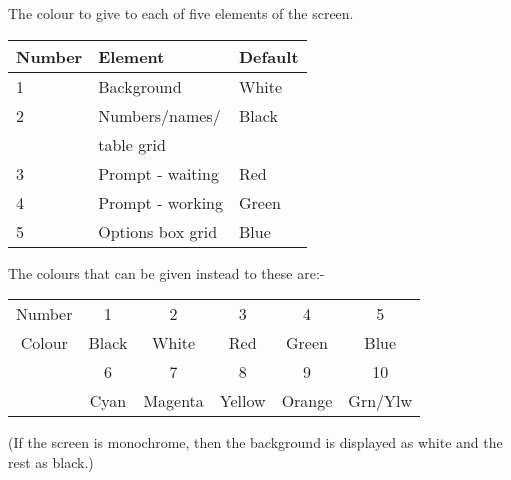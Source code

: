 \begin{small}
{{{  The colour to give to each of five elements of the screen.

\begin{tabular}{|l|l|l|}\hline
  Number &  Element          &   Default \\ \hline
    1    &  Background       &   White \\
    2    &  Numbers/names/   &   Black \\
         &  table grid       &          \\
    3    &  Prompt - waiting &   Red \\
    4    &  Prompt - working &   Green \\
    5    &  Options box grid &   Blue \\ \hline
\end{tabular}

  The colours that can be given instead to these are:-

\begin{tabular}{cccccc}
   Number  &  1    & 2       &  3     &   4    &   5 \\
   Colour  & Black & White   & Red    & Green  & Blue \\
           &   6   &  7      &    8   &    9   &     10 \\
           & Cyan  & Magenta & Yellow & Orange & Grn/Ylw \\
\end{tabular}

  (If the screen is monochrome, then the background is displayed
  as white and the rest as black.)

}}}
\end{small}
